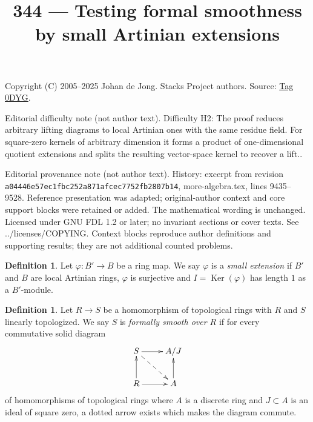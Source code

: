 \documentclass{amsart}
\theoremstyle{plain}
\theoremstyle{definition}
\newtheorem{definition}[subsection]{Definition}
\theoremstyle{remark}
\numberwithin{equation}{subsection}
\def\Ker{\mathop{\mathrm{Ker}}}
\begin{document}
\title[Stacks Project, Tag 0DYG]{344 --- Testing formal smoothness by small Artinian extensions}
\maketitle
\noindent Copyright (C) 2005--2025 Johan de Jong. Stacks Project authors. Source: \href{https://stacks.math.columbia.edu/tag/0DYG}{Tag 0DYG}.

\noindent Editorial difficulty note (not author text). Difficulty H2: The proof reduces arbitrary lifting diagrams to local Artinian ones with the same residue field. For square-zero kernels of arbitrary dimension it forms a product of one-dimensional quotient extensions and splits the resulting vector-space kernel to recover a lift..

\noindent Editorial provenance note (not author text). History: excerpt from revision \texttt{a0444\allowbreak 6e57e\allowbreak c1fbc\allowbreak 252a8\allowbreak 71afc\allowbreak ec775\allowbreak 2fb28\allowbreak 07b14}, more-algebra.tex, lines 9435--9528. Reference presentation was adapted; original-author context and core support blocks were retained or added. The mathematical wording is unchanged. Licensed under GNU FDL 1.2 or later; no invariant sections or cover texts. See ../licenses/COPYING. Context blocks reproduce author definitions and supporting results; they are not additional counted problems.

\begin{definition}
\label{algebra-definition-small-extension}
Let $\varphi : B' \to B$ be a ring map.
We say $\varphi$ is a {\it small extension} if
$B'$ and $B$ are local Artinian rings, $\varphi$ is surjective
and $I = \Ker(\varphi)$ has length $1$ as a $B'$-module.
\end{definition}

\begin{definition}
\label{definition-formally-smooth}
Let $R \to S$ be a homomorphism of topological rings with $R$ and $S$
linearly topologized. We say $S$ is {\it formally smooth over $R$} if
for every commutative solid diagram
$$
\xymatrix{
S \ar[r] \ar@{-->}[rd] & A/J \\
R \ar[r] \ar[u] & A \ar[u]
}
$$
of homomorphisms of topological rings where $A$ is a discrete ring and
$J \subset A$ is an ideal of square zero, a dotted arrow exists which
makes the diagram commute.
\end{definition}
\end{document}
